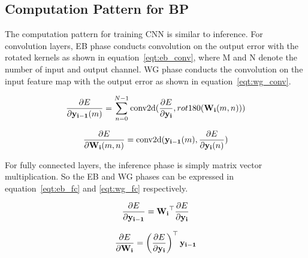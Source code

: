 \subsection{Computation Pattern for BP}
The computation pattern for training CNN is similar to inference. For convolution layers, EB phase conducts convolution on the output error with the rotated kernels as shown in equation~\ref{eqt:eb_conv}, where M and N denote the number of input and output channel. WG phase conducts the convolution on the input feature map with the output error as shown in equation~\ref{eqt:wg_conv}.

\begin{equation}\label{eqt:eb_conv}
  \frac{\partial E}{\partial \mathbf{y_{i-1}}(m)} = \sum\limits_{n=0}^{N-1}\text{conv2d}(\frac{\partial E}{\partial \mathbf{y_i}}, rot180(\mathbf{W_i}(m,n)))
\end{equation}

\begin{equation}\label{eqt:wg_conv}
  \frac{\partial E}{\partial \mathbf{W_i}(m, n)} = \text{conv2d}(\mathbf{y_{i-1}}(m), \frac{\partial E}{\partial \mathbf{y_i}(n)})
\end{equation}

For fully connected layers, the inference phase is simply matrix vector multiplication. So the EB and WG phases can be expressed in equation~\ref{eqt:eb_fc} and \ref{eqt:wg_fc} respectively.

\begin{equation}\label{eqt:eb_fc}
  \frac{\partial E}{\partial \mathbf{y_{i-1}}} = \mathbf{W_i}^\top \frac{\partial E}{\partial \mathbf{y_i}}
\end{equation}

\begin{equation}\label{eqt:wg_fc}
  \frac{\partial E}{\partial \mathbf{W_i}} = \left( \frac{\partial E}{\partial \mathbf{y_i}} \right)^\top \mathbf{y_{i-1}} 
\end{equation}

